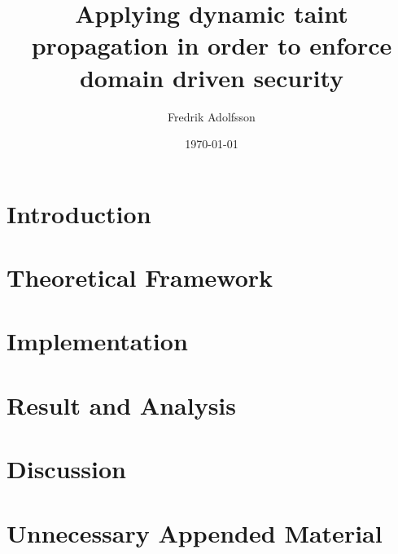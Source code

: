 \documentclass{kththesis}
\title{Applying dynamic taint propagation in order to enforce domain driven security}
\author{Fredrik Adolfsson}
\date{\today}
\begin{document}
\frontmatter

\titlepage





\tableofcontents


\mainmatter


\chapter{Introduction}


\chapter{Theoretical Framework}


\chapter{Implementation}


\chapter{Result and Analysis}


\chapter{Discussion}



\printbibliography[heading=bibintoc] %

\appendix

\chapter{Unnecessary Appended Material}
\end{document}

